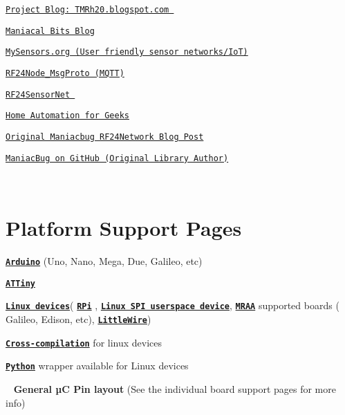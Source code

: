 \begin{DoxyItemize}
\item \href{http://TMRh20.blogspot.com}{\tt Project Blog\+: T\+M\+Rh20.\+blogspot.\+com } \item \href{http://maniacalbits.blogspot.ca/}{\tt Maniacal Bits Blog} \item \href{http://www.mysensors.org/}{\tt My\+Sensors.\+org (User friendly sensor networks/\+IoT)} \item \href{https://github.com/mannkind/RF24Node_MsgProto}{\tt R\+F24\+Node\+\_\+\+Msg\+Proto (M\+Q\+TT)} \item \href{https://bitbucket.org/pjhardy/rf24sensornet/}{\tt R\+F24\+Sensor\+Net } \item \href{http://www.homeautomationforgeeks.com/rf24software.shtml}{\tt Home Automation for Geeks} \item \href{https://maniacbug.wordpress.com/2012/03/30/rf24network/}{\tt Original Maniacbug R\+F24\+Network Blog Post} \item \href{https://github.com/maniacbug/RF24}{\tt Maniac\+Bug on Git\+Hub (Original Library Author)}\end{DoxyItemize}
~\newline
\hypertarget{index_Platform_Support}{}\section{Platform Support Pages}\label{index_Platform_Support}
\begin{DoxyItemize}
\item \href{Arduino.html}{\tt {\bfseries Arduino}} (Uno, Nano, Mega, Due, Galileo, etc) \item \href{ATTiny.html}{\tt {\bfseries A\+T\+Tiny}} \item \href{Linux.html}{\tt {\bfseries Linux devices}}( \href{RPi.html}{\tt {\bfseries R\+Pi}} , \href{Linux.html}{\tt {\bfseries Linux S\+PI userspace device}}, \href{MRAA.html}{\tt {\bfseries M\+R\+AA}} supported boards ( Galileo, Edison, etc), \href{LittleWire.html}{\tt {\bfseries Little\+Wire}}) \item \href{CrossCompile.html}{\tt {\bfseries Cross-\/compilation}} for linux devices \item \href{Python.html}{\tt {\bfseries Python}} wrapper available for Linux devices\end{DoxyItemize}
~\newline
 {\bfseries General µC Pin layout} (See the individual board support pages for more info)

